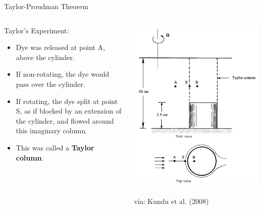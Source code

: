 \begin{frame}{Taylor-Proudman Theorem}
\setlength{\fboxsep}{0pt}
\setlength{\fboxrule}{1pt}
\begin{columns}[T]
    \begin{column}{.5\textwidth}
    	Taylor's Experiment:
    	\begin{itemize}
    		\item Dye was released at point A, above the cylinder.
    		\item If non-rotating, the dye would pass over the cylinder.
    		\item If rotating, the dye split at point S, as if blocked by an extension of the cylinder, and flowed around this imaginary column.
    		\item This was called a \textbf{Taylor column}.
    	\end{itemize}	
    \end{column}
    \begin{column}{.5\textwidth}
    	\begin{minipage}[c][.65\textheight][c]{\linewidth}
    		\includegraphics[width=\textwidth]{tp1}
    		\centering \tiny{~\\via: Kundu et al. (2008)}
    	\end{minipage}
    \end{column}
  \end{columns}
\end{frame}
